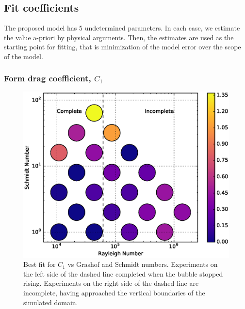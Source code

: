 \subsection{Fit coefficients}
The proposed model has 5 undetermined parameters.
In each case, we estimate the value a-priori by physical arguments.
Then, the estimates are used as the starting point for fitting, that is minimization of the model error over the scope of the model.

\subsubsection{Form drag coefficient, $C_1$}

\begin{figure}
\includegraphics[width=\columnwidth]{figs/C1-vs-Rayleigh-Schmidt}
\caption{ 
  Best fit for $C_1$ vs Grashof and Schmidt numbers.
  Experiments on the left side of the dashed line completed when the bubble stopped rising.
  Experiments on the right side of the dashed line are incomplete, having approached the vertical boundaries of the simulated domain.
}
\end{figure}

